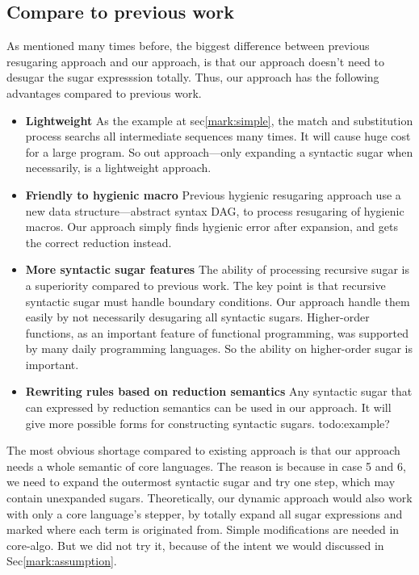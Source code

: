
\subsection{Compare to previous work}

As mentioned many times before, the biggest difference between previous resugaring approach and our approach, is that our approach doesn't need to desugar the sugar expresssion totally. Thus, our approach has the following advantages compared to previous work.

\begin{itemize}
	\item {\bfseries Lightweight} As the example at sec\ref{mark:simple}, the match and substitution process searchs all intermediate sequences many times. It will cause huge cost for a large program. So out approach---only expanding a syntactic sugar when necessarily, is a lightweight approach.
	\item {\bfseries Friendly to hygienic macro} Previous hygienic resugaring approach use a new data structure---abstract syntax DAG, to process resugaring of hygienic macros. Our approach simply finds hygienic error after expansion, and gets the correct reduction instead.
	\item {\bfseries More syntactic sugar features} The ability of processing recursive sugar is a superiority compared to previous work. The key point is that recursive syntactic sugar must handle boundary conditions. Our approach handle them easily by not necessarily desugaring all syntactic sugars. Higher-order functions, as an important feature of functional programming, was supported by many daily programming languages. So the ability on higher-order sugar is important.
	\item {\bfseries Rewriting rules based on reduction semantics} Any syntactic sugar that can expressed by reduction semantics can be used in our approach. It will give more possible forms for constructing syntactic sugars. todo:example?
\end{itemize}

The most obvious shortage compared to existing approach is that our approach needs a whole semantic of core languages. The reason is because in case 5 and 6, we need to expand the outermost syntactic sugar and try one step, which may contain unexpanded sugars. Theoretically, our dynamic approach would also work with only a core language's stepper, by totally expand all sugar expressions and marked where each term is originated from. Simple modifications are needed in core-algo. But we did not try it, because of the intent we would discussed in Sec\ref{mark:assumption}.
